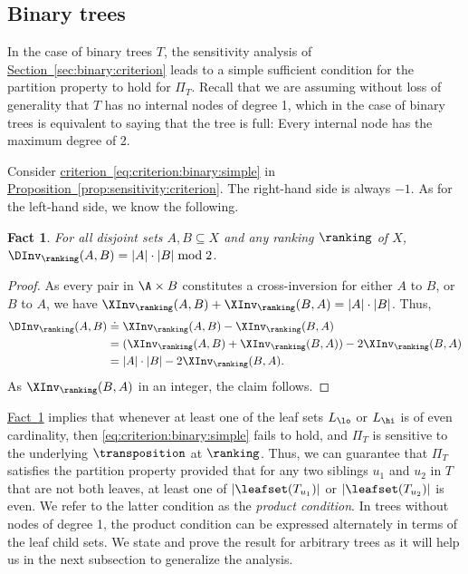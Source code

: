 \documentclass[11pt]{article}
\numberwithin{equation}{section}
\newtheorem{fact}[theorem]{Fact}
\theoremstyle{definition}
\theoremstyle{plain}
\newcommand{\expref}[2]{\hyperref[#2]{#1~\ref{#2}}}
\begin{document}
\subsection{Binary trees}
\label{sec:connectivity:binary}

In the case of binary trees $T$, the sensitivity analysis of \expref{Section}{sec:binary:criterion} leads to a simple sufficient condition for the partition property to hold for $\Pi_T$.
Recall that we are assuming without loss of generality that $T$ has no internal nodes of degree 1, which in the case of binary trees is equivalent to saying that the tree is full: Every internal node has the maximum degree of 2. 

Consider \expref{criterion}{eq:criterion:binary:simple} in \expref{Proposition}{prop:sensitivity:criterion}. The right-hand side is always $-1$. As for the left-hand side, we know the following.
\begin{fact}\label{fact:DInv:parity}
For all disjoint sets $A, B \subseteq X$ and any ranking $\ranking$ of $X$, $\DInv_\ranking(A,B) = |A| \cdot |B| \bmod 2$. 
\end{fact}
\begin{proof}
As every pair in $\A \times B$ constitutes a cross-inversion for either $A$ to $B$, or $B$ to $A$, we have 
$\XInv_\ranking(A,B) + \XInv_\ranking(B,A) = |A| \cdot |B|$.
%
Thus,
\begin{align}
\DInv_\ranking(A,B) 
& \doteq  \XInv_\ranking(A,B) - \XInv_\ranking(B,A) \nonumber \\
& = (\XInv_\ranking(A,B) + \XInv_\ranking(B,A)) - 2 \XInv_\ranking(B,A) \nonumber \\
& = |A| \cdot |B| - 2 \XInv_\ranking(B,A). \label{eq:DInv:as:XInv}
\end{align}
As $\XInv_\ranking(B,A)$ in an integer, the claim follows.
\end{proof}
\expref{Fact}{fact:DInv:parity} implies that whenever at least one of the leaf sets $L_\lo$ or $L_\hi$ is of even cardinality, then \eqref{eq:criterion:binary:simple} fails to hold, and $\Pi_T$ is sensitive to the underlying $\transposition$ at $\ranking$. Thus, we can guarantee that $\Pi_T$ satisfies the partition property provided that for any two siblings $u_1$ and $u_2$ in $T$ that are not both leaves, at least one of $\lvert\leafset(T_{u_1})\rvert$ or $\lvert\leafset(T_{u_2})\rvert$ is even. We refer to the latter condition as the \emph{product condition}. In trees without nodes of degree 1, the product condition can be expressed alternately in terms of the leaf child sets. We state and prove the result for arbitrary trees as it will help us in the next subsection to generalize the analysis.
\end{document}
